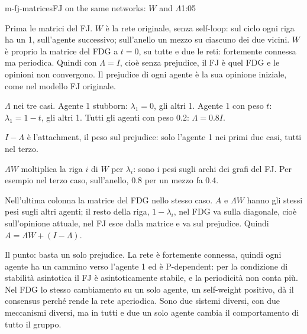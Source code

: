 \begin{slide}{m-fj-matrices}{FJ on the same networks: $W$ and $\Lambda$}{1:05}
  \begin{discorso}
    \item Prima le matrici del FJ. $W$ è la rete originale, senza self-loop: sul ciclo ogni riga ha un 1, sull'agente successivo; sull'anello un mezzo su ciascuno dei due vicini. $W$ è proprio la matrice del FDG a $t=0$, su tutte e due le reti: fortemente connessa ma periodica. Quindi con $\Lambda=I$, cioè senza prejudice, il FJ è quel FDG e le opinioni non convergono. Il prejudice di ogni agente è la sua opinione iniziale, come nel modello FJ originale.
    \item $\Lambda$ nei tre casi. Agente 1 stubborn: $\lambda_1=0$, gli altri 1. Agente 1 con peso $t$: $\lambda_1=1-t$, gli altri 1. Tutti gli agenti con peso 0.2: $\Lambda=0.8I$.
    \item $I-\Lambda$ è l'attachment, il peso sul prejudice: solo l'agente 1 nei primi due casi, tutti nel terzo.
    \item $\Lambda W$ moltiplica la riga $i$ di $W$ per $\lambda_i$: sono i pesi sugli archi dei grafi del FJ. Per esempio nel terzo caso, sull'anello, 0.8 per un mezzo fa 0.4.
    \item Nell'ultima colonna la matrice del FDG nello stesso caso. $A$ e $\Lambda W$ hanno gli stessi pesi sugli altri agenti; il resto della riga, $1-\lambda_i$, nel FDG va sulla diagonale, cioè sull'opinione attuale, nel FJ esce dalla matrice e va sul prejudice. Quindi $A=\Lambda W+(I-\Lambda)$.
    \item Il punto: basta un solo prejudice. La rete è fortemente connessa, quindi ogni agente ha un cammino verso l'agente 1 ed è P-dependent: per la condizione di stabilità asintotica il FJ è asintoticamente stabile, e la periodicità non conta più. Nel FDG lo stesso cambiamento su un solo agente, un self-weight positivo, dà il consensus perché rende la rete aperiodica. Sono due sistemi diversi, con due meccanismi diversi, ma in tutti e due un solo agente cambia il comportamento di tutto il gruppo.
  \end{discorso}
\end{slide}

